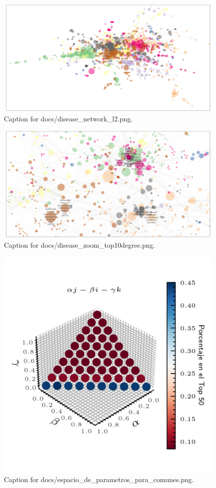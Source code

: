 \documentclass{article}
\begin{document}
\begin{figure}[h] \centering \includegraphics{docs/disease_network_l2.png} \caption{Caption for docs/disease_network_l2.png.} \end{figure}
\begin{figure}[h] \centering \includegraphics{docs/disease_zoom_top10degree.png} \caption{Caption for docs/disease_zoom_top10degree.png.} \end{figure}
\begin{figure}[h] \centering \includegraphics{docs/espacio_de_parametros_para_comunes.png} \caption{Caption for docs/espacio_de_parametros_para_comunes.png.} \end{figure}
\end{document}
